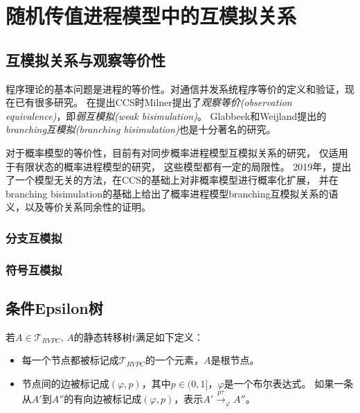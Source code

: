 \section{随机传值进程模型中的互模拟关系}

\subsection{互模拟关系与观察等价性}

   程序理论的基本问题是进程的等价性。对通信并发系统程序等价的定义和验证，现在已有很多研究。
   在提出CCS时Milner提出了\textit{观察等价(observation equivalence)}，即\textit{弱互模拟(weak bisimulation)}\cite{2}。
   Glabbeek和Weijland提出的\textit{branching互模拟(branching bisimulation)}\cite{6}也是十分著名的研究。

   对于概率模型的等价性，目前有对同步概率进程模型互模拟关系的研究\cite{13}，
   仅适用于有限状态的概率进程模型的研究\cite{14,15}，
   这些模型都有一定的局限性。
   2019年，\cite{7}提出了一个模型无关的方法，在CCS的基础上对非概率模型进行概率化扩展，
   并在branching bisimulation\cite{6}的基础上给出了概率进程模型branching互模拟关系的语义，以及等价关系同余性的证明。

   \subsubsection{分支互模拟}

   \subsubsection{符号互模拟}
\subsection{条件Epsilon树}
\begin{definition}
   \label{def:silent_tree}
   若$A\in \mathcal{T}_{RVPC}$,
   $A$的静态转移树$t$满足如下定义：
   \begin{itemize}
   \item 每一个节点都被标记成$\mathcal{T}_{RVPC}$的一个元素，$A$是根节点。
   \item {
      节点间的边被标记成$(\varphi,p)$，其中$p\in(0,1]$，$\varphi$是一个布尔表达式。
      如果一条从$A'$到$A''$的有向边被标记成$(\varphi,p)$，表示$A'\stackrel{p\tau}{\rightarrow}_{\varphi} A''$。
   }
   \end{itemize}
\end{definition}


